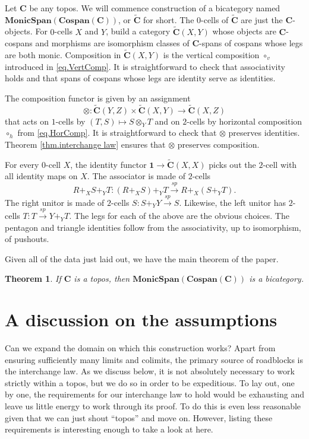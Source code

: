 \documentclass[11pt]{amsart}
\newcommand{\cat}[1]{\mathbf{#1}}
\newcommand{\from}{\colon}
\renewcommand{\span}{\xrightarrow{\mathit{sp}}}
\newcommand{\csC}{\widetilde{\mathbf{C}}}
\newtheorem{thm}{Theorem}[section]
\theoremstyle{remark}
\theoremstyle{definition}
\begin{document}
Let $\cat{C}$ be any topos. We will commence construction of a bicategory named $\cat{MonicSpan(Cospan(C))}$, or $\csC$ for short. The $0$-cells of $\csC$ are just the $\cat{C}$-objects. For $0$-cells $X$ and $Y$, build a category $\csC(X,Y)$ whose objects are $\cat{C}$-cospans and morphisms are isomorphism classes of $\cat{C}$-spans of cospans whose legs are both monic. Composition in $\csC (X,Y)$ is the vertical composition $\circ_v$ introduced in \eqref{eq.VertComp}. It is straightforward to check that associativity holds and that spans of cospans whose legs are identity serve as identities.
%
%
%
%
%
%

The composition functor is given by an assignment
\[
\otimes \from \csC(Y,Z) \times \csC(X,Y) \to \csC(X,Z)
\]
that acts on $1$-cells by $(T,S) \mapsto S \otimes_Y T$ and on $2$-cells by horizontal composition $\circ_h$ from \eqref{eq.HorComp}. It is straightforward to check that $\otimes$ preserves identities. Theorem \ref{thm.interchange law} ensures that $\otimes$ preserves composition.
%
%
%
%
%

For every $0$-cell $X$, the identity functor $\cat{1} \to \csC (X,X)$ picks out the $2$-cell with all identity maps on $X$. The associator is made of $2$-cells 
\[
R+_XS+_YT \from (R+_XS)+_YT \span R+_X(S+_YT).
\] 
The right unitor is made of $2$-cells $S \from S+_YY \span S$. Likewise, the left unitor has $2$-cells $T \from T \span Y+_YT$. The legs for each of the above are the obvious choices. The pentagon and triangle identities follow from the associativity, up to isomorphism, of pushouts. 
%
%
%
%
%

Given all of the data just laid out, we have the main theorem of the paper.

\begin{thm}
	If $\cat{C}$ is a topos, then $\cat{MonicSpan(Cospan(C))}$ is a bicategory.
\end{thm}
%
%
%
%
%
%
%
%
\section{A discussion on the assumptions}  %
\label{sec.Disc on Assump}
%

Can we expand the domain on which this construction works? Apart from ensuring sufficiently many limits and colimits, the primary source of roadblocks is the interchange law. As we discuss below, it is not absolutely necessary to work strictly within a topos, but we do so in order to be expeditious.  To lay out, one by one, the requirements for our interchange law to hold would be exhausting and leave us little energy to work through its proof. To do this is even less reasonable given that we can just shout ``topos'' and move on.   However, listing these requirements is interesting enough to take a look at here.  
%
%
%
%
%
\end{document}
